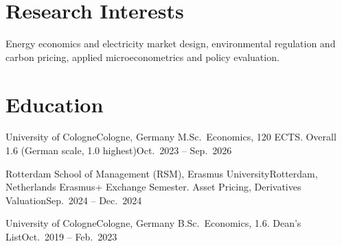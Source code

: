 \documentclass[serif,compact]{../../../cv/shared/OpenCV}
\begin{document}
\cvheader

\section*{Research Interests}
\small
Energy economics and electricity market design, environmental regulation and carbon pricing, applied microeconometrics and policy evaluation.

\section*{Education}
\resumeSubHeadingListStart

\resumeSubheading
{University of Cologne}{Cologne, Germany}
{M.Sc.\ Economics, 120 ECTS. Overall 1.6 (German scale, 1.0 highest)}{Oct.\ 2023 -- Sep.\ 2026}
\resumeItemListStart
{}
\resumeItemListEnd

\resumeSubheading
{Rotterdam School of Management (RSM), Erasmus University}{Rotterdam, Netherlands}
{Erasmus+ Exchange Semester. Asset Pricing, Derivatives Valuation}{Sep.\ 2024 -- Dec.\ 2024}

\resumeSubheading
{University of Cologne}{Cologne, Germany}
{B.Sc.\ Economics, 1.6. Dean's List}{Oct.\ 2019 -- Feb.\ 2023}
\resumeItemListStart
\resumeItemListEnd
\end{document}
